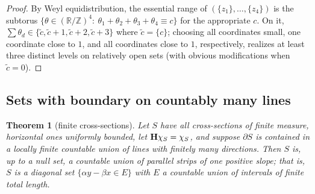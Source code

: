\documentclass{article}
\newtheorem{theorem}{Theorem}
\def\H{{\bf H}}
\def\R{{\mathbb R}}
\def\Z{{\mathbb Z}}
\begin{document}
	\begin{proof}
		By Weyl equidistribution, the essential range of $(\{z_1\},\dots,\{z_4\})$ is the subtorus $\{\theta\in(\R/\Z)^4:\ \theta_1+\theta_2+\theta_3+\theta_4\equiv c\}$ for the appropriate $c$. On it, $\sum\theta_d\in\{\tilde c,\tilde c+1,\tilde c+2,\tilde c+3\}$ where $\tilde c=\{c\}$; choosing all coordinates small, one coordinate close to $1$, and all coordinates close to $1$, respectively, realizes at least three distinct levels on relatively open sets (with obvious modifications when $\tilde c=0$).
	\end{proof}

	\subsection{Sets with boundary on countably many lines}

	\begin{theorem}[finite cross-sections]\label{Tlines}
		Let $S$ have all cross-sections of finite measure, horizontal ones uniformly bounded, let $\H\chi_S=\chi_S$, and suppose $\partial S$ is contained in a locally finite countable union of lines with finitely many directions. Then $S$ is, up to a null set, a countable union of parallel strips of one positive slope; that is, $S$ is a diagonal set $\{\alpha y-\beta x\in E\}$ with $E$ a countable union of intervals of finite total length.
	\end{theorem}
\end{document}
